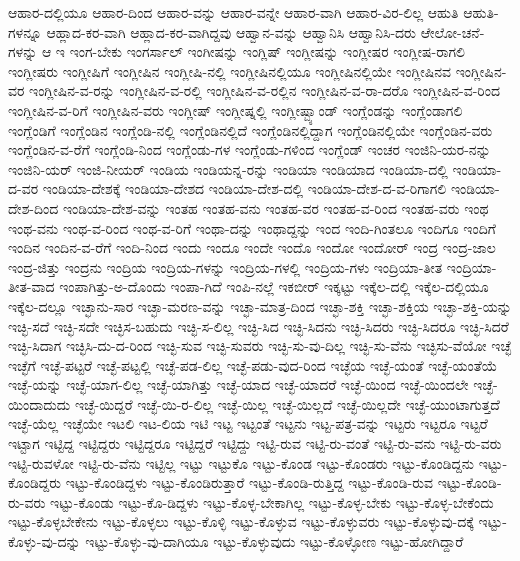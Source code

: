 {ಆಹಾರ-ದಲ್ಲಿಯೂ
ಆಹಾರ-ದಿಂದ
ಆಹಾರ-ವನ್ನು
ಆಹಾರ-ವನ್ನೇ
ಆಹಾರ-ವಾಗಿ
ಆಹಾರ-ವಿರ-ಲಿಲ್ಲ
ಆಹುತಿ
ಆಹುತಿ-ಗಳನ್ನೂ
ಆಹ್ಲಾದ-ಕರ-ವಾಗಿ
ಆಹ್ಲಾದ-ಕರ-ವಾಗಿದ್ದವು
ಆಹ್ವಾನ-ವನ್ನು
ಆಹ್ವಾನಿಸಿ
ಆಹ್ವಾನಿಸಿ-ದರು
ಆೇಲೋ-ಚನೆ-ಗಳನ್ನು
ಆ
ಇ
ಇಂಗ-ಬೇಕು
ಇಂಗರ್ಸಾಲ್
ಇಂಗೀಷನ್ನು
ಇಂಗ್ಲಿಷ್
ಇಂಗ್ಲೀಷನ್ನು
ಇಂಗ್ಲೀಷರ
ಇಂಗ್ಲೀಷ-ರಾಗಲಿ
ಇಂಗ್ಲೀಷರು
ಇಂಗ್ಲೀಷಿಗೆ
ಇಂಗ್ಲೀಷಿನ
ಇಂಗ್ಲೀಷಿ-ನಲ್ಲಿ
ಇಂಗ್ಲೀಷಿನಲ್ಲಿಯೂ
ಇಂಗ್ಲೀಷಿನಲ್ಲಿಯೇ
ಇಂಗ್ಲೀಷಿನವ
ಇಂಗ್ಲೀಷಿನ-ವರ
ಇಂಗ್ಲೀಷಿನ-ವ-ರನ್ನು
ಇಂಗ್ಲೀಷಿನ-ವ-ರಲ್ಲಿ
ಇಂಗ್ಲೀಷಿನ-ವ-ರಲ್ಲಿನ
ಇಂಗ್ಲೀಷಿನ-ವ-ರಾ-ದರೊ
ಇಂಗ್ಲೀಷಿನ-ವ-ರಿಂದ
ಇಂಗ್ಲೀಷಿನ-ವ-ರಿಗೆ
ಇಂಗ್ಲೀಷಿನ-ವರು
ಇಂಗ್ಲೀಷ್
ಇಂಗ್ಲೀಷ್ನಲ್ಲಿ
ಇಂಗ್ಲೀಷ್ಬ್ಯಾಂಡ್
ಇಂಗ್ಲೆಂಡನ್ನು
ಇಂಗ್ಲೆಂಡಾಗಲಿ
ಇಂಗ್ಲೆಂಡಿಗೆ
ಇಂಗ್ಲೆಂಡಿನ
ಇಂಗ್ಲೆಂಡಿ-ನಲ್ಲಿ
ಇಂಗ್ಲೆಂಡಿನಲ್ಲಿದೆ
ಇಂಗ್ಲೆಂಡಿನಲ್ಲಿದ್ದಾಗ
ಇಂಗ್ಲೆಂಡಿನಲ್ಲಿಯೇ
ಇಂಗ್ಲೆಂಡಿನ-ವರು
ಇಂಗ್ಲೆಂಡಿನ-ವ-ರೆಗೆ
ಇಂಗ್ಲೆಂಡಿ-ನಿಂದ
ಇಂಗ್ಲೆಂಡು-ಗಳ
ಇಂಗ್ಲೆಂಡು-ಗಳಿಂದ
ಇಂಗ್ಲೆಂಡ್
ಇಂಚರ
ಇಂಜಿನಿ-ಯರ-ನನ್ನು
ಇಂಜಿನಿ-ಯರ್
ಇಂಜಿ-ನೀಯರ್
ಇಂಡಿಯ
ಇಂಡಿಯನ್ನ-ರನ್ನು
ಇಂಡಿಯಾ
ಇಂಡಿಯಾದ
ಇಂಡಿಯಾ-ದಲ್ಲಿ
ಇಂಡಿಯಾ-ದ-ವರ
ಇಂಡಿಯಾ-ದೇಶಕ್ಕೆ
ಇಂಡಿಯಾ-ದೇಶದ
ಇಂಡಿಯಾ-ದೇಶ-ದಲ್ಲಿ
ಇಂಡಿಯಾ-ದೇಶ-ದ-ವ-ರಿಗಾಗಲಿ
ಇಂಡಿಯಾ-ದೇಶ-ದಿಂದ
ಇಂಡಿಯಾ-ದೇಶ-ವನ್ನು
ಇಂತಹ
ಇಂತಹ-ವನು
ಇಂತಹ-ವರ
ಇಂತಹ-ವ-ರಿಂದ
ಇಂತಹ-ವರು
ಇಂಥ
ಇಂಥ-ವನು
ಇಂಥ-ವ-ರಿಂದ
ಇಂಥ-ವ-ರಿಗೆ
ಇಂಥಾ-ದನ್ನು
ಇಂಥಾದ್ದನ್ನು
ಇಂದ
ಇಂದಿ-ಗಿಂತಲೂ
ಇಂದಿಗೂ
ಇಂದಿಗೆ
ಇಂದಿನ
ಇಂದಿನ-ವ-ರೆಗೆ
ಇಂದಿ-ನಿಂದ
ಇಂದು
ಇಂದೂ
ಇಂದೇ
ಇಂದೊ
ಇಂದೋ
ಇಂದೋರ್
ಇಂದ್ರ
ಇಂದ್ರ-ಜಾಲ
ಇಂದ್ರ-ಜಿತ್ತು
ಇಂದ್ರನು
ಇಂದ್ರಿಯ
ಇಂದ್ರಿಯ-ಗಳನ್ನು
ಇಂದ್ರಿಯ-ಗಳಲ್ಲಿ
ಇಂದ್ರಿಯ-ಗಳು
ಇಂದ್ರಿಯಾ-ತೀತ
ಇಂದ್ರಿಯಾ-ತೀತ-ವಾದ
ಇಂಪಾಗಿತ್ತು-ಅ-ದೊಂದು
ಇಂಪಾ-ಗಿದೆ
ಇಂಪಿ-ನಲ್ಲೆ
ಇಕಬೀರ್
ಇಕ್ಕಟ್ಟು
ಇಕ್ಕೆಲ-ದಲ್ಲಿ
ಇಕ್ಕೆಲ-ದಲ್ಲಿಯೂ
ಇಕ್ಕೆಲ-ದಲ್ಲೂ
ಇಚ್ಛಾನು-ಸಾರ
ಇಚ್ಛಾ-ಮರಣ-ವನ್ನು
ಇಚ್ಛಾ-ಮಾತ್ರ-ದಿಂದ
ಇಚ್ಛಾ-ಶಕ್ತಿ
ಇಚ್ಛಾ-ಶಕ್ತಿಯ
ಇಚ್ಛಾ-ಶಕ್ತಿ-ಯನ್ನು
ಇಚ್ಛಿ-ಸದೆ
ಇಚ್ಛಿ-ಸದೇ
ಇಚ್ಛಿಸ-ಬಹುದು
ಇಚ್ಛಿ-ಸ-ಲಿಲ್ಲ
ಇಚ್ಛಿ-ಸಿದ
ಇಚ್ಛಿ-ಸಿದನು
ಇಚ್ಛಿ-ಸಿದರು
ಇಚ್ಛಿ-ಸಿದರೂ
ಇಚ್ಛಿ-ಸಿದರೆ
ಇಚ್ಛಿ-ಸಿದಾಗ
ಇಚ್ಛಿಸಿ-ದು-ದ-ರಿಂದ
ಇಚ್ಛಿ-ಸುವ
ಇಚ್ಛಿ-ಸುವರು
ಇಚ್ಛಿ-ಸು-ವು-ದಿಲ್ಲ
ಇಚ್ಛಿ-ಸು-ವೆನು
ಇಚ್ಛಿಸು-ವೆಯೋ
ಇಚ್ಛೆ
ಇಚ್ಛೆಗೆ
ಇಚ್ಛೆ-ಪಟ್ಟರೆ
ಇಚ್ಛೆ-ಪಟ್ಟಲ್ಲಿ
ಇಚ್ಛೆ-ಪಡ-ಲಿಲ್ಲ
ಇಚ್ಛೆ-ಪಡು-ವುದ-ರಿಂದ
ಇಚ್ಛೆಯ
ಇಚ್ಛೆ-ಯಂತೆ
ಇಚ್ಛೆ-ಯಂತೆಯೆ
ಇಚ್ಛೆ-ಯನ್ನು
ಇಚ್ಛೆ-ಯಾಗ-ಲಿಲ್ಲ
ಇಚ್ಛೆ-ಯಾಗಿತ್ತು
ಇಚ್ಛೆ-ಯಾದ
ಇಚ್ಛೆ-ಯಾದರೆ
ಇಚ್ಛೆ-ಯಿಂದ
ಇಚ್ಛೆ-ಯಿಂದಲೇ
ಇಚ್ಛೆ-ಯಿಂದಾದುದು
ಇಚ್ಛೆ-ಯಿದ್ದರೆ
ಇಚ್ಛೆ-ಯಿ-ರ-ಲಿಲ್ಲ
ಇಚ್ಛೆ-ಯಿಲ್ಲ
ಇಚ್ಛೆ-ಯಿಲ್ಲದೆ
ಇಚ್ಛೆ-ಯಿಲ್ಲದೇ
ಇಚ್ಛೆ-ಯುಂಟಾಗುತ್ತದೆ
ಇಚ್ಛೆ-ಯೆಲ್ಲ
ಇಚ್ಛೆಯೇ
ಇಟಲಿ
ಇಟ-ಲಿಯ
ಇಟಿ
ಇಟ್ಟ
ಇಟ್ಟಂತೆ
ಇಟ್ಟನು
ಇಟ್ಟ-ಪತ್ರ-ವನ್ನು
ಇಟ್ಟರು
ಇಟ್ಟರೂ
ಇಟ್ಟರೆ
ಇಟ್ಟಾಗ
ಇಟ್ಟಿದ್ದ
ಇಟ್ಟಿದ್ದರು
ಇಟ್ಟಿದ್ದರೂ
ಇಟ್ಟಿದ್ದರೆ
ಇಟ್ಟಿದ್ದು
ಇಟ್ಟಿ-ರುವ
ಇಟ್ಟಿ-ರು-ವಂತೆ
ಇಟ್ಟಿ-ರು-ವನು
ಇಟ್ಟಿ-ರು-ವರು
ಇಟ್ಟಿ-ರುವಳೋ
ಇಟ್ಟಿ-ರು-ವೆನು
ಇಟ್ಟಿಲ್ಲ
ಇಟ್ಟು
ಇಟ್ಟುಕೊ
ಇಟ್ಟು-ಕೊಂಡ
ಇಟ್ಟು-ಕೊಂಡರು
ಇಟ್ಟು-ಕೊಂಡಿದ್ದನು
ಇಟ್ಟು-ಕೊಂಡಿದ್ದರು
ಇಟ್ಟು-ಕೊಂಡಿದ್ದಳು
ಇಟ್ಟು-ಕೊಂಡಿರುತ್ತಾರೆ
ಇಟ್ಟು-ಕೊಂಡಿ-ರುತ್ತಿದ್ದ
ಇಟ್ಟು-ಕೊಂಡಿ-ರುವ
ಇಟ್ಟು-ಕೊಂಡಿ-ರು-ವರು
ಇಟ್ಟು-ಕೊಂಡು
ಇಟ್ಟು-ಕೊ-ಡಿದ್ದಳು
ಇಟ್ಟು-ಕೊಳ್ಳ-ಬೇಕಾಗಿಲ್ಲ
ಇಟ್ಟು-ಕೊಳ್ಳ-ಬೇಕು
ಇಟ್ಟು-ಕೊಳ್ಳ-ಬೇಕೆಂದು
ಇಟ್ಟು-ಕೊಳ್ಳಬೇಕೇನು
ಇಟ್ಟು-ಕೊಳ್ಳಲು
ಇಟ್ಟು-ಕೊಳ್ಳಿ
ಇಟ್ಟು-ಕೊಳ್ಳುವ
ಇಟ್ಟು-ಕೊಳ್ಳುವರು
ಇಟ್ಟು-ಕೊಳ್ಳುವು-ದಕ್ಕೆ
ಇಟ್ಟು-ಕೊಳ್ಳು-ವು-ದನ್ನು
ಇಟ್ಟು-ಕೊಳ್ಳು-ವು-ದಾಗಿಯೂ
ಇಟ್ಟು-ಕೊಳ್ಳುವುದು
ಇಟ್ಟು-ಕೊಳ್ಳೋಣ
ಇಟ್ಟು-ಹೋಗಿದ್ದಾರೆ
}
